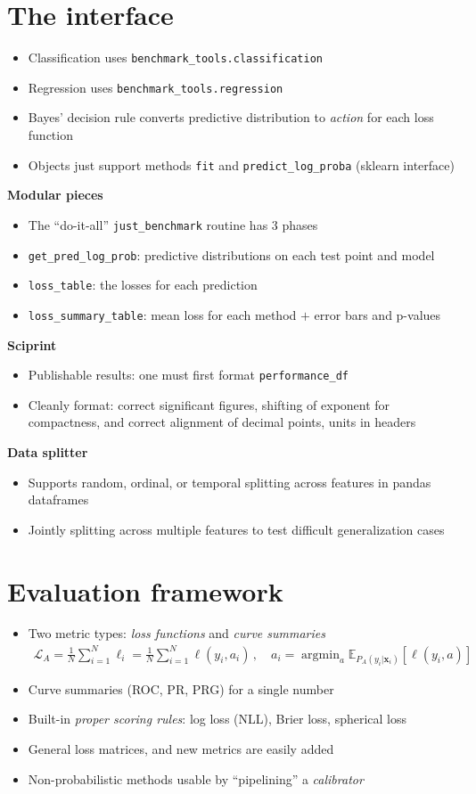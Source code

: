\documentclass[a0,landscape]{a0poster}
\newcommand{\mysection}[1]{\section*{\fontsize{67.1}{82} \selectfont \color{NavyBlue} #1 \color{Black}}}
\renewcommand{\vec}[1]{{\boldsymbol{\mathbf{#1}}}} %
\newcommand{\E}{\mathbb{E}}
\newcommand{\Loss}{\mathcal{L}}
\newcommand{\loss}{\ell}
\DeclareMathOperator*{\argmin}{argmin}
\newcommand{\code}{\texttt}
\newcommand{\sectionx}{\textbf}
\begin{document}
\begin{multicols}{3}
\mysection{The interface}
%
\begin{itemize}
  \item Classification uses \code{benchmark\_tools.classification}
  \item Regression uses \code{benchmark\_tools.regression}
  \item Bayes' decision rule converts predictive distribution to \emph{action} for each loss function
  \item Objects just support methods \code{fit} and \code{predict\_log\_proba} (sklearn interface)
\end{itemize}
%
\sectionx{Modular pieces}
\begin{itemize}
  \item The ``do-it-all'' \code{just\_benchmark} routine has 3 phases
  \item \code{get\_pred\_log\_prob}: predictive distributions on each test point and model
  \item \code{loss\_table}: the losses for each prediction
  \item \code{loss\_summary\_table}: mean loss for each method $+$ error bars and p-values
\end{itemize}
%
\sectionx{Sciprint}
\begin{itemize}
  \item Publishable results: one must first format \code{performance\_df}
  \item Cleanly format: correct significant figures, shifting of exponent for compactness, and correct alignment of decimal points, units in headers
\end{itemize}
%
\sectionx{Data splitter}
\begin{itemize}
  \item Supports random, ordinal, or temporal splitting across features in pandas dataframes
  \item Jointly splitting across multiple features to test difficult generalization cases
\end{itemize}

\columnbreak

\mysection{Evaluation framework}

\begin{itemize}
  \item Two metric types: \emph{loss functions} and \emph{curve summaries}
  \begin{align}
    \Loss_A = \frac{1}{N} \sum_{i=1}^N \loss_i = \frac{1}{N} \sum_{i=1}^N \loss(y_i, a_i)\,, \quad a_i = \argmin_a \E_{P_A(y_i|\vec x_i)}[\loss(y_i, a)]
  \end{align}
  \item Curve summaries (ROC, PR, PRG) for a single number
  \item Built-in \emph{proper scoring rules}: log loss (NLL), Brier loss, spherical loss
  \item General loss matrices, and new metrics are easily added
  \item Non-probabilistic methods usable by ``pipelining'' a \emph{calibrator}
\end{itemize}


\end{multicols}
\end{document}
